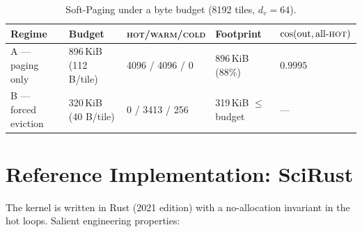 \documentclass[11pt]{article}
\theoremstyle{plain}
\theoremstyle{definition}
\begin{document}
\begin{table}[t]
\centering
\caption{Soft-Paging under a byte budget (8192 tiles, $d_v=64$).}
\label{tab:softpaging}
\small
\begin{tabular}{@{}lllll@{}}
\toprule
Regime & Budget & \textsc{hot}/\textsc{warm}/\textsc{cold} & Footprint & $\cos(\text{out}, \text{all-}\textsc{hot})$ \\
\midrule
A --- paging only      & 896\,KiB (112 B/tile) & 4096 / 4096 / 0    & 896\,KiB (88\%)      & $\mathbf{0.9995}$ \\
B --- forced eviction  & 320\,KiB (40 B/tile)  & 0 / 3413 / 256     & 319\,KiB $\le$ budget & --- \\
\bottomrule
\end{tabular}
\end{table}

\section{Reference Implementation: SciRust}
\label{sec:impl}

The kernel is written in Rust (2021 edition) with a no-allocation
invariant in the hot loops. Salient engineering properties:
\end{document}
